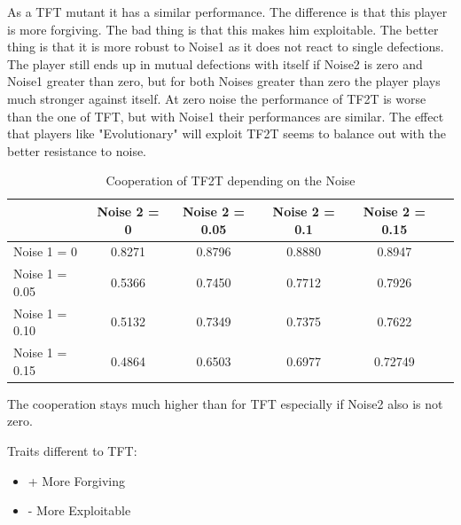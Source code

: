 As a TFT mutant it has a similar performance. The difference is that this player is more forgiving. The bad thing is that this makes him exploitable. The better thing is that it is more robust to Noise1 as it does not react to single defections. The player still ends up in mutual defections with itself if Noise2 is zero and Noise1 greater than zero, but for both Noises greater than zero the player plays much stronger against itself. At zero noise the performance of TF2T is worse than the one of TFT, but with Noise1 their performances are similar. The effect that players like "Evolutionary" will exploit TF2T seems to balance out with the better resistance to noise.

\begin{table}[h]
 \begin{center}
\caption{Cooperation of TF2T depending on the Noise} \vspace{3mm}
\begin{tabular}{|l|c|c|c|c|c|}
\hline
   	& Noise 2 = 0 & Noise 2 = 0.05& Noise 2 = 0.1& Noise 2 = 0.15 \\
  \hline
  Noise 1 = 0 	&        0.8271&    0.8796 &   0.8880  & 0.8947 \\
 \hline
  Noise 1 = 0.05	 &       0.5366  &  0.7450  &  0.7712 &   0.7926 \\
 \hline
  Noise 1 = 0.10 	&    0.5132 &   0.7349  &  0.7375&   0.7622 \\
 \hline
  Noise 1 = 0.15 	&     0.4864 &   0.6503 &   0.6977   & 0.72749 \\
 \hline
\end{tabular}
 \end{center}
\end{table}

The cooperation stays much higher than for TFT especially if Noise2 also is not zero.

Traits different to TFT:

\renewcommand{\labelitemi}{}
\begin{itemize}
	\item + More Forgiving
	\item - More Exploitable
\end{itemize}
\renewcommand{\labelitemi}{$\bullet$}
 
